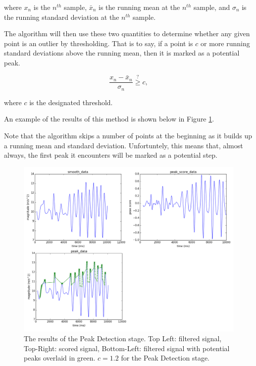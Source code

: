            where $x_n$ is the $n^{th}$ sample, $\bar{x}_n$ is the running mean at the $n^{th}$ sample, and $\sigma_n$ is the running standard deviation at the $n^{th}$ sample.

            The algorithm will then use these two quantities to determine whether any given point is an outlier by thresholding. That is to say, if a point is $c$ or more running standard deviations above the running mean, then it is marked as a potential peak.

            \begin{equation}
                \frac{x_n - \bar{x}_n}{\sigma_n} \stackrel{?}{\geq} c,
            \end{equation}

            where $c$ is the designated threshold.

            An example of the results of this method is shown below in Figure \ref{img_detection_stage}.

            Note that the algorithm skips a number of points at the beginning as it builds up a running mean and standard deviation. Unfortuntely, this means that, almost always, the first peak it encounters will be marked as a potential step.

            \begin{figure}[!th]
                \includegraphics[width=\textwidth]{Images/detection_stage.png}
                \centering
                \caption{The results of the Peak Detection stage. Top Left: filtered signal, Top-Right: scored signal, Bottom-Left: filtered signal with potential peaks overlaid in green. $c=1.2$ for the Peak Detection stage.}
                \label{img_detection_stage}
            \end{figure}


